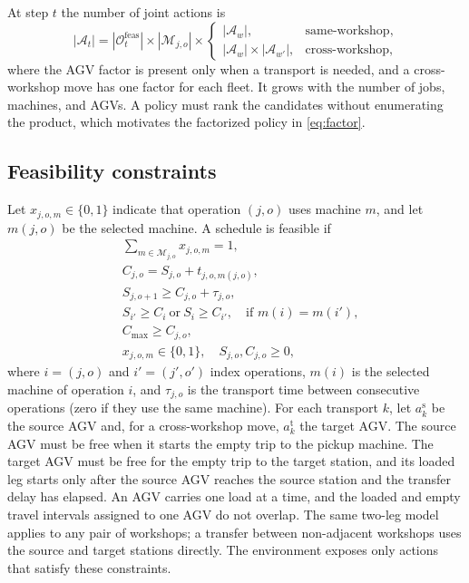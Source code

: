 At step $t$ the number of joint actions is
\begin{equation}
|\mathcal{A}_t|=
|\mathcal{O}^{\mathrm{feas}}_t|\times
|\mathcal{M}_{j,o}|\times
\begin{cases}
|\mathcal{A}_{w}|, & \text{same-workshop},\\
|\mathcal{A}_{w}|\times|\mathcal{A}_{w'}|, & \text{cross-workshop},
\end{cases}
\end{equation}
where the AGV factor is present only when a transport is needed, and a
cross-workshop move has one factor for each fleet. It grows
with the number of jobs, machines, and AGVs. A policy must rank
the candidates without enumerating the product, which motivates the
factorized policy in \eqref{eq:factor}.

\subsection{Feasibility constraints}

Let $x_{j,o,m}\in\{0,1\}$ indicate that operation $(j,o)$ uses machine $m$,
and let $m(j,o)$ be the selected machine. A schedule is feasible if
\begin{align}
&\sum_{m\in\mathcal{M}_{j,o}} x_{j,o,m}=1, \label{eq:assign}\\
&C_{j,o}=S_{j,o}+t_{j,o,m(j,o)}, \label{eq:completion}\\
&S_{j,o+1}\ge C_{j,o}+\tau_{j,o}, \label{eq:precedence}\\
&S_{i'}\ge C_i \ \text{or}\ S_i\ge C_{i'}, \quad \text{if } m(i)=m(i'), \label{eq:machine}\\
&C_{\max}\ge C_{j,o}, \label{eq:cmax}\\
&x_{j,o,m}\in\{0,1\},\quad S_{j,o},C_{j,o}\ge0, \label{eq:domain}
\end{align}
where $i=(j,o)$ and $i'=(j',o')$ index operations, $m(i)$ is the selected
machine of operation $i$, and $\tau_{j,o}$ is the
transport time between consecutive operations (zero
if they use the same machine). For each transport $k$, let $a^{\mathrm{s}}_k$ be
the source AGV and, for a cross-workshop move, $a^{\mathrm{t}}_k$ the target
AGV. The source AGV must be free when it starts the empty trip to the pickup
machine. The target AGV must be free for the empty trip to the target station,
and its loaded leg
starts only after the source AGV reaches the source station and the transfer
delay has elapsed. An AGV carries one load at a time, and the loaded and empty
travel intervals assigned to one AGV do not overlap. The same two-leg model
applies to any pair of workshops; a transfer between non-adjacent workshops
uses the source and target stations directly. The environment exposes only
actions that satisfy these constraints.

